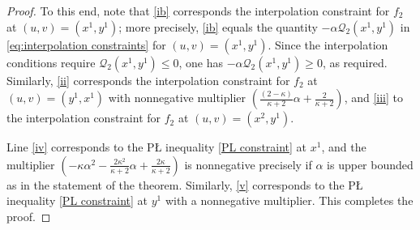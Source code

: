 \documentclass[10pt,a4paper]{amsart}
\begin{document}
\begin{proof}
To this end, note that \eqref{ib} corresponds the interpolation constraint for $f_2$ at $(u,v) = (x^1,y^1)$; more precisely, \eqref{ib} equals
 the quantity
$- \alpha \mathcal{Q}_2(x^1,y^1)$ in \eqref{eq:interpolation constraints}  for $(u,v) = (x^1,y^1)$. Since the interpolation conditions require
$\mathcal{Q}_2(x^1,y^1) \le 0$, one has $- \alpha \mathcal{Q}_2(x^1,y^1) \ge 0$, as required.
Similarly, \eqref{ii} corresponds the interpolation constraint for $f_2$ at $(u,v) = (y^1,x^1)$ with
nonnegative multiplier $\left(\frac{(2-\kappa)}{\kappa+2}\alpha + \frac{2}{\kappa+2}\right)$,
and \eqref{iii} to  the interpolation constraint for $f_2$ at $(u,v) = (x^2,y^1)$.

Line \eqref{iv} corresponds to the P{\L} inequality \eqref{PL constraint} at $x^1$, and the multiplier
 $\left(-\kappa\alpha^2 - \frac{2\kappa^2}{\kappa+2}\alpha + \frac{2\kappa}{\kappa+2}\right)$
is nonnegative precisely if $\alpha$ is upper bounded as in the statement of the theorem.
Similarly, \eqref{v} corresponds to the P{\L} inequality \eqref{PL constraint} at $y^1$ with a nonnegative multiplier.
This completes the proof.


\end{proof}
\end{document}
